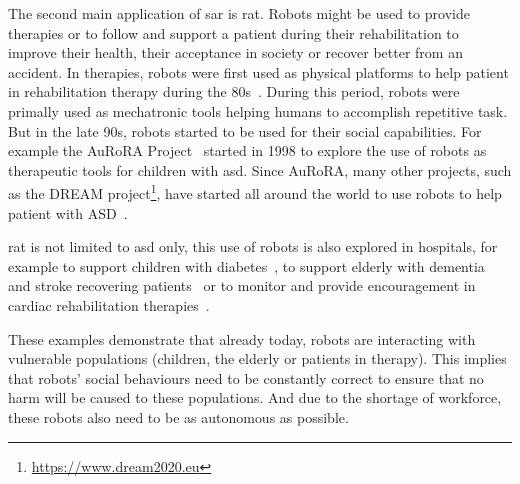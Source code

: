 		
	The second main application of \gls{sar} is \gls{rat}. Robots might be used to provide therapies or to follow and support a patient during their rehabilitation to improve their health, their acceptance in society or recover better from an accident. In therapies, robots were first used as physical platforms to help patient in rehabilitation therapy during the 80s~\citep{harwin1988robot}. During this period, robots were primally used as mechatronic tools helping humans to accomplish repetitive task. But in the late 90s, robots started to be used for their social capabilities. For example the AuRoRA Project~\citep{dautenhahn1999robots} started in 1998 to explore the use of robots as therapeutic tools for children with \gls{asd}. Since AuRoRA, many other projects, such as the DREAM project\footnote{\url{https://www.dream2020.eu}}, have started all around the world to use robots to help patient with ASD~\citep{diehl2012clinical,esteban2017build}. 
	
	\gls{rat} is not limited to \gls{asd} only, this use of robots is also explored in hospitals, for example to support children with diabetes~\citep{belpaeme2012multimodal}, to support elderly with dementia~\citep{wada2005psychological} and stroke recovering patients~\citep{mataric2007socially} or to monitor and provide encouragement in cardiac rehabilitation therapies~\citep{lara2017human}.	
	
	These examples demonstrate that already today, robots are interacting with vulnerable populations (children, the elderly or patients in therapy). This implies that robots' social behaviours need to be constantly correct to ensure that no harm will be caused to these populations. And due to the shortage of workforce, these robots also need to be as autonomous as possible.
	
